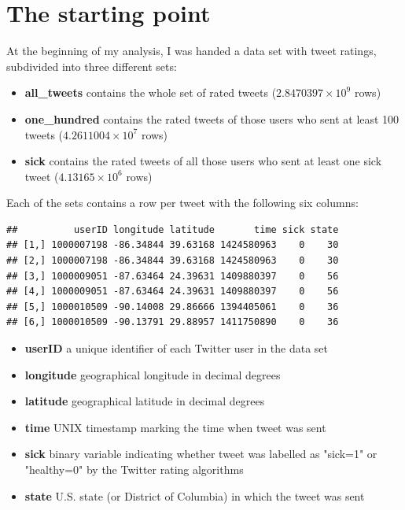 \documentclass[11pt, a4paper]{report}\usepackage[]{graphicx}\usepackage[]{color}
\makeatletter
\newenvironment{kframe}{%
 \def\at@end@of@kframe{}%
 \ifinner\ifhmode%
  \def\at@end@of@kframe{\end{minipage}}%
  \begin{minipage}{\columnwidth}%
 \fi\fi%
 \def\FrameCommand##1{\hskip\@totalleftmargin \hskip-\fboxsep
 \colorbox{shadecolor}{##1}\hskip-\fboxsep
     \hskip-\linewidth \hskip-\@totalleftmargin \hskip\columnwidth}%
 \MakeFramed {\advance\hsize-\width
   \@totalleftmargin\z@ \linewidth\hsize
   \@setminipage}}%
 {\par\unskip\endMakeFramed%
 \at@end@of@kframe}
\newenvironment{knitrout}{}{} %
\makeatother
\begin{document}
\section{The starting point}

At the beginning of my analysis, I was handed a data set with tweet ratings, subdivided into three different sets: 

\begin{itemize}
  \item \textbf{all\_tweets} contains the whole set of rated tweets (\ensuremath{2.8470397\times 10^{9}} rows)
  \item \textbf{one\_hundred} contains the rated tweets of those users who sent at least 100 tweets (\ensuremath{4.2611004\times 10^{7}} rows)
  \item \textbf{sick} contains the rated tweets of all those users who sent at least one sick tweet (\ensuremath{4.13165\times 10^{6}} rows)
\end{itemize}

Each of the sets contains a row per tweet with the following six columns: 

\begin{knitrout}
\color{fgcolor}\begin{kframe}
\begin{verbatim}
##          userID longitude latitude       time sick state
## [1,] 1000007198 -86.34844 39.63168 1424580963    0    30
## [2,] 1000007198 -86.34844 39.63168 1424580963    0    30
## [3,] 1000009051 -87.63464 24.39631 1409880397    0    56
## [4,] 1000009051 -87.63464 24.39631 1409880397    0    56
## [5,] 1000010509 -90.14008 29.86666 1394405061    0    36
## [6,] 1000010509 -90.13791 29.88957 1411750890    0    36
\end{verbatim}
\end{kframe}
\end{knitrout}

\begin{itemize}
  \item \textbf{userID} a unique identifier of each Twitter user in the data set
  \item \textbf{longitude} geographical longitude in decimal degrees
  \item \textbf{latitude} geographical latitude in decimal degrees
  \item \textbf{time} UNIX timestamp marking the time when tweet was sent
  \item \textbf{sick} binary variable indicating whether tweet was labelled as "sick=1" or "healthy=0" by the Twitter rating algorithms
  \item \textbf{state} U.S. state (or District of Columbia) in which the tweet was sent
\end{itemize}
\end{document}
